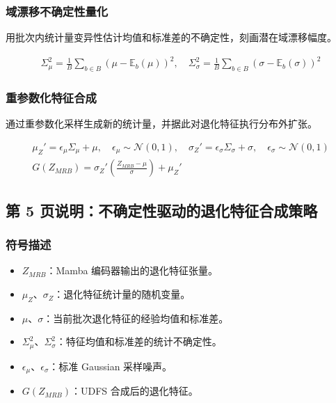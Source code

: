﻿\documentclass[UTF8,a4paper,10pt]{ctexart}
\begin{document}
\subsubsection*{域漂移不确定性量化}
用批次内统计量变异性估计均值和标准差的不确定性，刻画潜在域漂移幅度。
\begin{formulabox}
\[\begin{gathered}
  \Sigma_{\mu}^{2}
  = \frac{1}{B}\sum_{b\in B}\left(\mu-\mathbb{E}_b(\mu)\right)^2, \quad
  \Sigma_{\sigma}^{2}
  = \frac{1}{B}\sum_{b\in B}\left(\sigma-\mathbb{E}_b(\sigma)\right)^2 
\end{gathered}\]
\end{formulabox}

\subsubsection*{重参数化特征合成}
通过重参数化采样生成新的统计量，并据此对退化特征执行分布外扩张。
\begin{formulabox}
\[\begin{gathered}
  \mu_Z' = \epsilon_{\mu}\Sigma_{\mu}+\mu, \quad
  \epsilon_{\mu}\sim\mathcal{N}(0,1),\quad
  \sigma_Z' = \epsilon_{\sigma}\Sigma_{\sigma}+\sigma, \quad
  \epsilon_{\sigma}\sim\mathcal{N}(0,1) \\
  G(Z_{MRB})
  = \sigma_Z'\left(\frac{Z_{MRB}-\mu}{\sigma}\right)+\mu_Z' 
\end{gathered}\]
\end{formulabox}

\clearpage
\subsection*{第 5 页说明：不确定性驱动的退化特征合成策略}
\subsubsection*{符号描述}
\begin{itemize}
  \item $Z_{MRB}$：Mamba 编码器输出的退化特征张量。
  \item $\mu_Z$、$\sigma_Z$：退化特征统计量的随机变量。
  \item $\mu$、$\sigma$：当前批次退化特征的经验均值和标准差。
  \item $\Sigma_\mu^2$、$\Sigma_\sigma^2$：特征均值和标准差的统计不确定性。
  \item $\epsilon_\mu$、$\epsilon_\sigma$：标准 Gaussian 采样噪声。
  \item $G(Z_{MRB})$：UDFS 合成后的退化特征。
\end{itemize}
\end{document}

